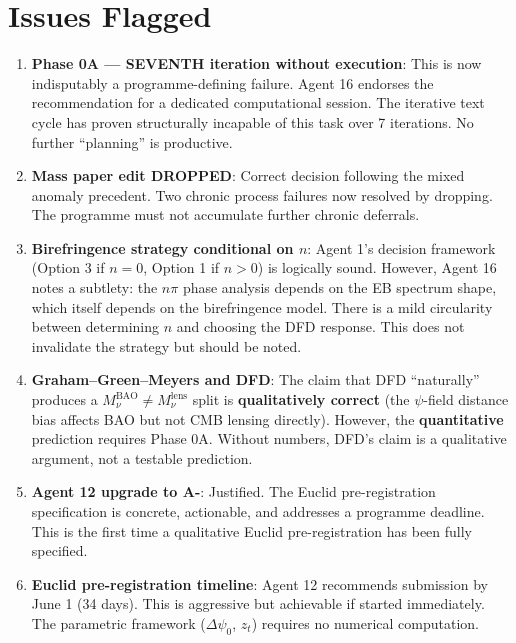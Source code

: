 \documentclass[11pt,a4paper]{article}
\begin{document}
\section{Issues Flagged}

\begin{enumerate}
\item \textbf{Phase 0A --- SEVENTH iteration without execution}: This is now indisputably a programme-defining failure. Agent 16 endorses the recommendation for a dedicated computational session. The iterative text cycle has proven structurally incapable of this task over 7 iterations. No further ``planning'' is productive.

\item \textbf{Mass paper edit DROPPED}: Correct decision following the mixed anomaly precedent. Two chronic process failures now resolved by dropping. The programme must not accumulate further chronic deferrals.

\item \textbf{Birefringence strategy conditional on $n$}: Agent 1's decision framework (Option 3 if $n = 0$, Option 1 if $n > 0$) is logically sound. However, Agent 16 notes a subtlety: the $n\pi$ phase analysis depends on the EB spectrum shape, which itself depends on the birefringence model. There is a mild circularity between determining $n$ and choosing the DFD response. This does not invalidate the strategy but should be noted.

\item \textbf{Graham--Green--Meyers and DFD}: The claim that DFD ``naturally'' produces a $M_\nu^{\text{BAO}} \neq M_\nu^{\text{lens}}$ split is \textbf{qualitatively correct} (the $\psi$-field distance bias affects BAO but not CMB lensing directly). However, the \textbf{quantitative} prediction requires Phase 0A. Without numbers, DFD's claim is a qualitative argument, not a testable prediction.

\item \textbf{Agent 12 upgrade to A-}: Justified. The Euclid pre-registration specification is concrete, actionable, and addresses a programme deadline. This is the first time a qualitative Euclid pre-registration has been fully specified.

\item \textbf{Euclid pre-registration timeline}: Agent 12 recommends submission by June 1 (34 days). This is aggressive but achievable if started immediately. The parametric framework ($\Delta\psi_0$, $z_t$) requires no numerical computation.
\end{enumerate}
\end{document}
